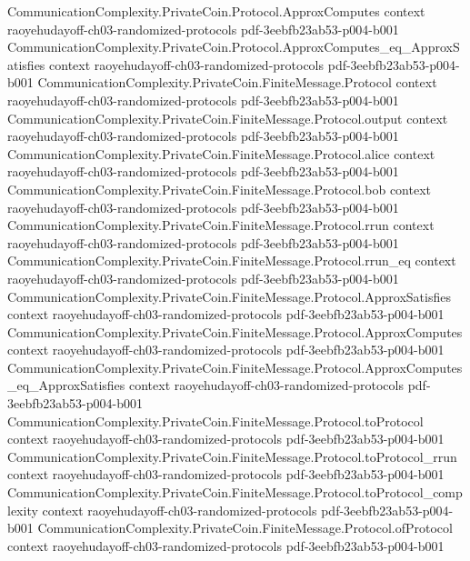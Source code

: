 \begin{theorem}
\proofstep
  {CommunicationComplexity.PrivateCoin.Protocol.ApproxComputes}
  {context}
  {raoyehudayoff-ch03-randomized-protocols}
  {pdf-3eebfb23ab53-p004-b001}
\proofstep
  {CommunicationComplexity.PrivateCoin.Protocol.ApproxComputes_eq_ApproxSatisfies}
  {context}
  {raoyehudayoff-ch03-randomized-protocols}
  {pdf-3eebfb23ab53-p004-b001}
\proofstep
  {CommunicationComplexity.PrivateCoin.FiniteMessage.Protocol}
  {context}
  {raoyehudayoff-ch03-randomized-protocols}
  {pdf-3eebfb23ab53-p004-b001}
\proofstep
  {CommunicationComplexity.PrivateCoin.FiniteMessage.Protocol.output}
  {context}
  {raoyehudayoff-ch03-randomized-protocols}
  {pdf-3eebfb23ab53-p004-b001}
\proofstep
  {CommunicationComplexity.PrivateCoin.FiniteMessage.Protocol.alice}
  {context}
  {raoyehudayoff-ch03-randomized-protocols}
  {pdf-3eebfb23ab53-p004-b001}
\proofstep
  {CommunicationComplexity.PrivateCoin.FiniteMessage.Protocol.bob}
  {context}
  {raoyehudayoff-ch03-randomized-protocols}
  {pdf-3eebfb23ab53-p004-b001}
\proofstep
  {CommunicationComplexity.PrivateCoin.FiniteMessage.Protocol.rrun}
  {context}
  {raoyehudayoff-ch03-randomized-protocols}
  {pdf-3eebfb23ab53-p004-b001}
\proofstep
  {CommunicationComplexity.PrivateCoin.FiniteMessage.Protocol.rrun_eq}
  {context}
  {raoyehudayoff-ch03-randomized-protocols}
  {pdf-3eebfb23ab53-p004-b001}
\proofstep
  {CommunicationComplexity.PrivateCoin.FiniteMessage.Protocol.ApproxSatisfies}
  {context}
  {raoyehudayoff-ch03-randomized-protocols}
  {pdf-3eebfb23ab53-p004-b001}
\proofstep
  {CommunicationComplexity.PrivateCoin.FiniteMessage.Protocol.ApproxComputes}
  {context}
  {raoyehudayoff-ch03-randomized-protocols}
  {pdf-3eebfb23ab53-p004-b001}
\proofstep
  {CommunicationComplexity.PrivateCoin.FiniteMessage.Protocol.ApproxComputes_eq_ApproxSatisfies}
  {context}
  {raoyehudayoff-ch03-randomized-protocols}
  {pdf-3eebfb23ab53-p004-b001}
\proofstep
  {CommunicationComplexity.PrivateCoin.FiniteMessage.Protocol.toProtocol}
  {context}
  {raoyehudayoff-ch03-randomized-protocols}
  {pdf-3eebfb23ab53-p004-b001}
\proofstep
  {CommunicationComplexity.PrivateCoin.FiniteMessage.Protocol.toProtocol_rrun}
  {context}
  {raoyehudayoff-ch03-randomized-protocols}
  {pdf-3eebfb23ab53-p004-b001}
\proofstep
  {CommunicationComplexity.PrivateCoin.FiniteMessage.Protocol.toProtocol_complexity}
  {context}
  {raoyehudayoff-ch03-randomized-protocols}
  {pdf-3eebfb23ab53-p004-b001}
\proofstep
  {CommunicationComplexity.PrivateCoin.FiniteMessage.Protocol.ofProtocol}
  {context}
  {raoyehudayoff-ch03-randomized-protocols}
  {pdf-3eebfb23ab53-p004-b001}
\proofstep

\end{theorem}
